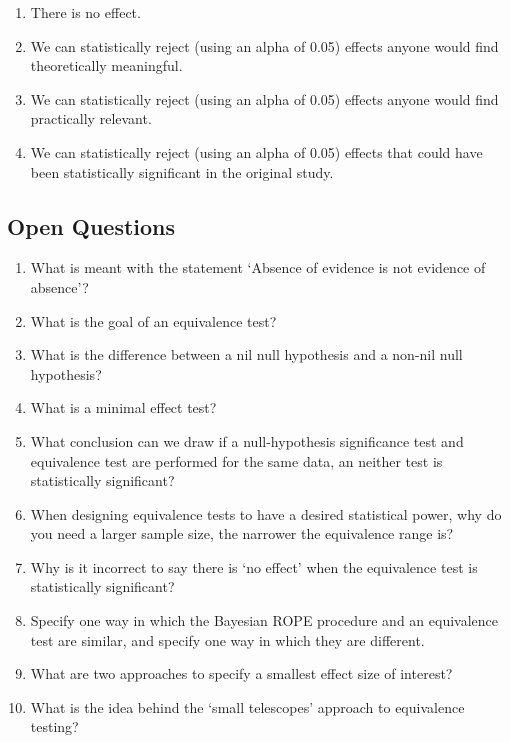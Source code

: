 \documentclass[
  oneside]{book}
\providecommand{\tightlist}{%
  \setlength{\itemsep}{0pt}\setlength{\parskip}{0pt}}
\begin{document}
\begin{enumerate}
\def\labelenumi{\Alph{enumi})}
\tightlist
\item
  There is no effect.
\item
  We can statistically reject (using an alpha of 0.05) effects anyone would find theoretically meaningful.
\item
  We can statistically reject (using an alpha of 0.05) effects anyone would find practically relevant.
\item
  We can statistically reject (using an alpha of 0.05) effects that could have been statistically significant in the original study.
\end{enumerate}

\hypertarget{open-questions-7}{%
\subsection{Open Questions}\label{open-questions-7}}

\begin{enumerate}
\def\labelenumi{\arabic{enumi}.}
\item
  What is meant with the statement `Absence of evidence is not evidence of absence'?
\item
  What is the goal of an equivalence test?
\item
  What is the difference between a nil null hypothesis and a non-nil null hypothesis?
\item
  What is a minimal effect test?
\item
  What conclusion can we draw if a null-hypothesis significance test and equivalence test
  are performed for the same data, an neither test is statistically significant?
\item
  When designing equivalence tests to have a desired statistical power, why do you need a
  larger sample size, the narrower the equivalence range is?
\item
  Why is it incorrect to say there is `no effect' when the equivalence test is statistically significant?
\item
  Specify one way in which the Bayesian ROPE procedure and an equivalence test are similar, and specify one way in which they are different.
\item
  What are two approaches to specify a smallest effect size of interest?
\item
  What is the idea behind the `small telescopes' approach to equivalence testing?
\end{enumerate}
\end{document}
